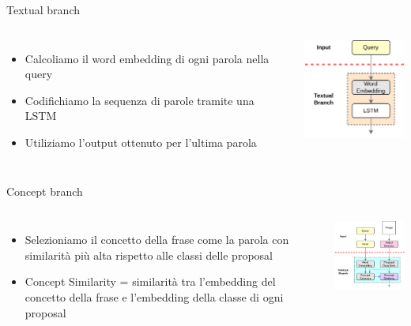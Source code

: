 \documentclass{beamer}
\begin{document}
\begin{frame}{Textual branch}
  \begin{columns}
      \begin{itemize}
        \item Calcoliamo il \alert{word embedding} di ogni parola nella query
        \item Codifichiamo la \alert{sequenza} di parole tramite una LSTM
        \item Utiliziamo l'output ottenuto per \alert{l'ultima} parola
      \end{itemize}
      \centering
      \includegraphics[width=3.5cm]{images/textual-branch.png}
  \end{columns}
\end{frame}

\begin{frame}{Concept branch}
  \begin{columns}
      \begin{itemize}
        \item Selezioniamo il \alert{concetto} della frase come la
        \alert{parola} con similarità più alta rispetto alle classi
        delle proposal
        \item Concept Similarity = similarità tra \alert{l'embedding del
        concetto} della frase e \alert{l'embedding della classe} di ogni
        proposal
      \end{itemize}
      \centering
      \includegraphics[width=4.5cm]{images/concept-branch.png}
  \end{columns}
\end{frame}
\end{document}
